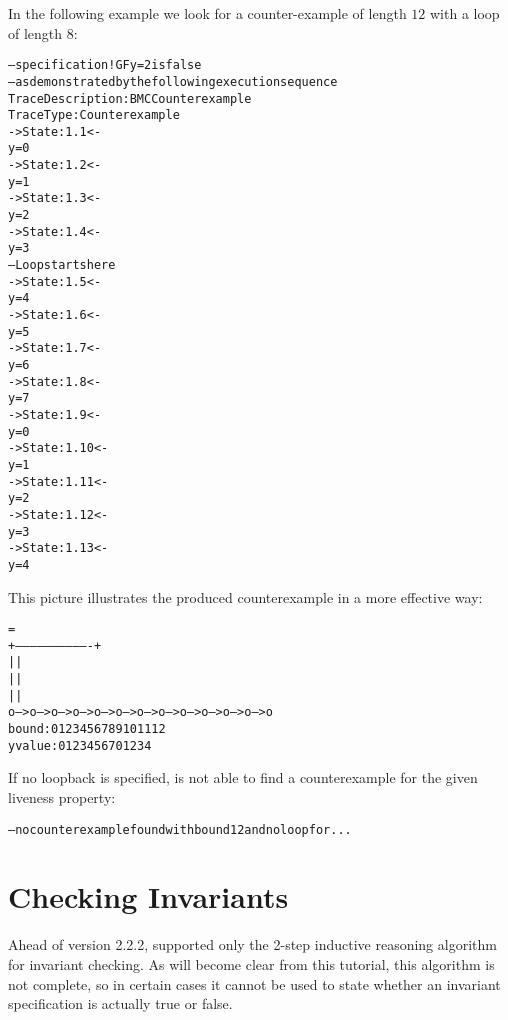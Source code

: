 In the following example we look for a counter-example of length $12$ with
a loop of length $8$:
\begin{alltt}
\shellprompt {}
\nusmvprompt {}
\nusmvprompt {}
-- specification ! G  F y = 2   is false
-- as demonstrated by the following execution sequence
Trace Description: BMC Counterexample
Trace Type: Counterexample
-> State: 1.1 <-
  y = 0
-> State: 1.2 <-
  y = 1
-> State: 1.3 <-
  y = 2
-> State: 1.4 <-
  y = 3
-- Loop starts here
-> State: 1.5 <-
  y = 4
-> State: 1.6 <-
  y = 5
-> State: 1.7 <-
  y = 6
-> State: 1.8 <-
  y = 7
-> State: 1.9 <-
  y = 0
-> State: 1.10 <-
  y = 1
-> State: 1.11 <-
  y = 2
-> State: 1.12 <-
  y = 3
-> State: 1.13 <-
  y = 4
\nusmvprompt   
\end{alltt}
\pagebreak[3]
This picture illustrates the produced counterexample in a more
effective way:\\
\begin{alltt}
                                           =
                         +-------------------------------+
                         |                               |
                         |                               |
                         |                               |
         o-->o-->o-->o-->o-->o-->o-->o-->o-->o-->o-->o-->o
bound:   0   1   2   3   4   5   6   7   8   9   10  11  12
y value: 0   1   2   3   4   5   6   7   0   1   2   3   4
\end{alltt} 
If no loopback is specified, \nusmv is not able to
find a counterexample for the given liveness property:
\begin{alltt}
\shellprompt {}
\nusmvprompt {}
\nusmvprompt {}
-- no counterexample found with bound 12 and no loop for ...
\nusmvprompt
\end{alltt}

\section{Checking Invariants}
\label{Checking Invariants}

Ahead of version 2.2.2, \nusmv supported only the 2-step inductive
reasoning algorithm for invariant checking. As will become clear from
this tutorial, this algorithm is not complete, so in certain cases it
cannot be used to state whether an invariant specification is actually
true or false.

